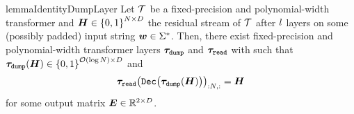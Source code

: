 \begin{restatable}{lemma}{IdentityDumpLayer} \label{lem:idenitity-dump}
   Let ${{\mathcal{T}}}$ be a fixed-precision and polynomial-width transformer and ${{{{{{{\bm{H}}}}}}}} \in {\left\{ 0, 1 \right\}}^{{{N}} \times {{D}}}$ the residual stream of ${{\mathcal{T}}}$ after ${{l}}$ layers on some (possibly padded) input string ${{\boldsymbol{w}}} \in {{{{{{\Sigma}}^{*}}}}}$.
   Then, there exist fixed-precision and polynomial-width transformer layers ${{{{\boldsymbol{\tau}}}_{\texttt{dump}}}}$ and ${{{{\boldsymbol{\tau}}}_{\texttt{read}}}}$ with such that $\dumpLayerFun{\residStream} \in \set{0, 1}^{\bigOFun{\log\strlen} \times \hiddDim}$ and 
   \begin{equation}
      \readLayerFun{\decodeStepFun{\dumpLayerFun{\residStream}}}_{: \strlen, :} = \residStream
   \end{equation}
   for some output matrix ${{{{{\bm{E}}}}}} \in {{\mathbb{R}}}^{2 \times {{D}}}$.
\end{restatable}
